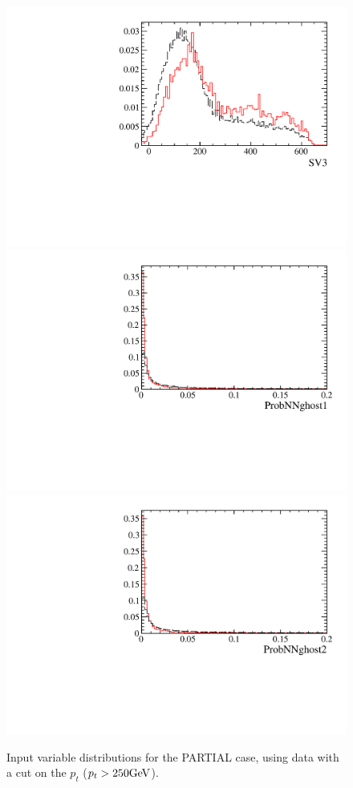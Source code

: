 \begin{figure} [htb!]
\begin{center}
\includegraphics[scale=0.20]{figs/SV3PARTIALptcut.pdf}
\includegraphics[scale=0.20]{figs/ProbNNghost1PARTIALptcut.pdf}
\includegraphics[scale=0.20]{figs/ProbNNghost2PARTIALptcut.pdf}
\caption{Input variable distributions for the PARTIAL case, using \Kspipi data with a cut on the $p_t$ ($p_t > 250 \rm GeV$).
\label{fig:MVAhistos_PARTIAL2pipi1}}
\end{center}
\end{figure}


